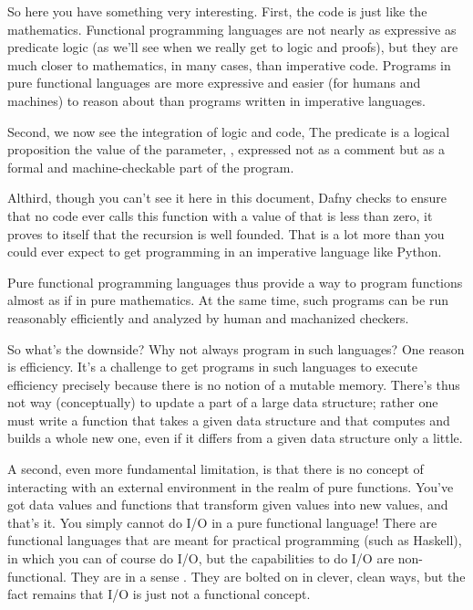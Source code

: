 \documentclass[letterpaper,10pt,english]{sphinxmanual}
\begin{document}
So here you have something very interesting. First, the code is just
like the mathematics. Functional programming languages are not nearly
as expressive as predicate logic (as we’ll see when we really get to
logic and proofs), but they are much closer to mathematics, in many
cases, than imperative code. Programs in pure functional languages are
more expressive and easier (for humans and machines) to reason about
than programs written in imperative languages.

Second, we now see the integration of logic and code, The 
predicate is a logical proposition  the value of the parameter,
, expressed not as a comment but as a formal and machine-checkable
part of the program.

Althird, though you can’t see it here in this document, Dafny checks
to ensure that no code ever calls this function with a value of 
that is less than zero,  it proves to itself that the recursion
is well founded.  That is a lot more than you could ever expect to get
programming in an imperative language like Python.

Pure functional programming languages thus provide a way to program
functions almost as if in pure mathematics. At the same time, such
programs can be run reasonably efficiently and analyzed by human and
machanized checkers.

So what’s the downside? Why not always program in such languages?  One
reason is efficiency. It’s a challenge to get programs in such
languages to execute efficiency precisely because there is no notion
of a mutable memory. There’s thus not way (conceptually) to update a
part of a large data structure; rather one must write a function that
takes a given data structure and that computes and builds a whole new
one, even if it differs from a given data structure only a little.

A second, even more fundamental limitation, is that there is no
concept of interacting with an external environment in the realm of
pure functions. You’ve got data values and functions that transform
given values into new values, and that’s it. You simply cannot do I/O
in a pure functional language! There are functional languages that are
meant for practical programming (such as Haskell), in which you can of
course do I/O, but the capabilities to do I/O are non-functional. They
are in a sense . They are bolted on in clever, clean ways,
but the fact remains that I/O is just not a functional concept.
\end{document}
